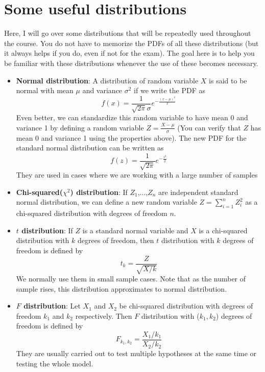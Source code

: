 \section{Some useful distributions}
Here, I will go over some distributions that will be repeatedly used throughout the course. You do not have to memorize the PDFs of all these distributions (but it always helps if you do, even if not for the exam). The goal here is to help you be familiar with these distributions whenever the use of these becomes necessary.
\begin{itemize}
\item \textbf{Normal distribution}: A distribution of random variable $X$ is said to be normal with mean $\mu$ and variance $\sigma^2$ if we write the PDF as
\[
f(x) = \frac{1}{\sqrt{2\pi}\sigma}e^{-\frac{(x-\mu)^2}{2}}
\]
Even better, we can standardize this random variable to have mean 0 and variance 1 by defining a random variable $Z=\frac{X-\mu}{\sigma}$ (You can verify that $Z$ has mean 0 and variance 1 using the properties above).  The new PDF for the standard normal distribution can be written as 
\[
f(z) = \frac{1}{\sqrt{2\pi}}e^{-\frac{z^2}{2}}
\]
They are used in cases where we are working with a large number of samples
\item \textbf{Chi-squared($\chi^2$) distribution}: If $Z_1$,...,$Z_n$ are independent standard normal distribution, we can define a new random variable $Z=\sum_{i=1}^n Z_i^2$ as a chi-squared distribution with degrees of freedom $n$.  
\item \textbf{$t$ distribution}: If $Z$ is a standard normal variable and $X$ is a chi-squared distribution with $k$ degrees of freedom, then $t$ distribution with $k$ degrees of freedom is defined by
\[
t_k=\frac{Z}{\sqrt{X/k}}
\]
We normally use them in small sample cases. Note that as the number of sample rises, this distribution approximates to normal distribution. 
\item \textbf{$F$ distribution}: Let $X_1$ and $X_2$ be chi-squared distribution with degrees of freedom $k_1$ and $k_2$ respectively. Then $F$ distribution with ($k_1,k_2$) degrees of freedom is defined by
\[
F_{k_1,k_2}=\frac{X_1/k_1}{X_2/k_2}
\]
They are usually carried out to test multiple hypotheses at the same time or testing the whole model. 
\end{itemize}
